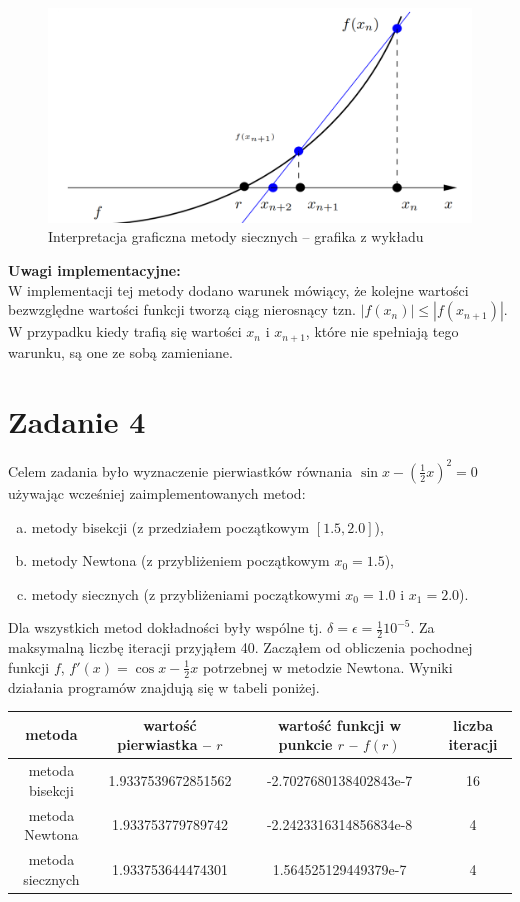 \documentclass[]{article}
\begin{document}
	\begin{figure}[!htbp]
		\includegraphics[scale=0.59]{secant}
		\centering
		\caption{Interpretacja graficzna metody siecznych -- grafika z wykładu}
	\end{figure}
	\clearpage

	\noindent\textbf{Uwagi implementacyjne:}\\
	W implementacji tej metody dodano warunek mówiący, że kolejne wartości bezwzględne wartości funkcji tworzą ciąg nierosnący tzn. $|f(x_n)| \leq |f(x_{n+1})|$. W przypadku kiedy trafią się wartości $x_n$ i $x_{n+1}$, które nie spełniają tego warunku, są one ze sobą zamieniane.
	
	
	
	
	\section*{Zadanie 4}

	Celem zadania było wyznaczenie pierwiastków równania $\sin{x}-(\frac{1}{2}x)^2 = 0$ używając wcześniej zaimplementowanych metod:
	\begin{enumerate}[(a)]
		\item metody bisekcji (z przedziałem początkowym $[1.5, 2.0]$),
		\item metody Newtona (z przybliżeniem początkowym $x_0 = 1.5$),  
		\item metody siecznych (z przybliżeniami początkowymi $x_0 = 1.0$ i $x_1 = 2.0$).
	\end{enumerate}
	Dla wszystkich metod dokładności były wspólne tj. $\delta = \epsilon = \frac{1}{2}10^{-5}$. Za maksymalną liczbę iteracji przyjąłem 40. Zacząłem od obliczenia pochodnej funkcji $f$, $f'(x) = \cos{x} - \frac{1}{2}x$ potrzebnej w metodzie Newtona. Wyniki działania programów znajdują się w tabeli poniżej.
	
	\begin{table}[h!]
		\centering
		\label{tab:table1}
		\begin{tabular}{|c|c|c|c|}
			\hline
			metoda & wartość pierwiastka -- $r$ & wartość funkcji w punkcie $r$ -- $f(r)$ & liczba iteracji \\ \hline
			metoda bisekcji & 1.9337539672851562 & -2.7027680138402843e-7 & 16 \\ \hline
			metoda Newtona & 1.933753779789742 & -2.2423316314856834e-8 & 4 \\ \hline
			metoda siecznych & 1.933753644474301 & 1.564525129449379e-7 & 4 \\ \hline
		\end{tabular}
	\end{table}
	
\end{document}
